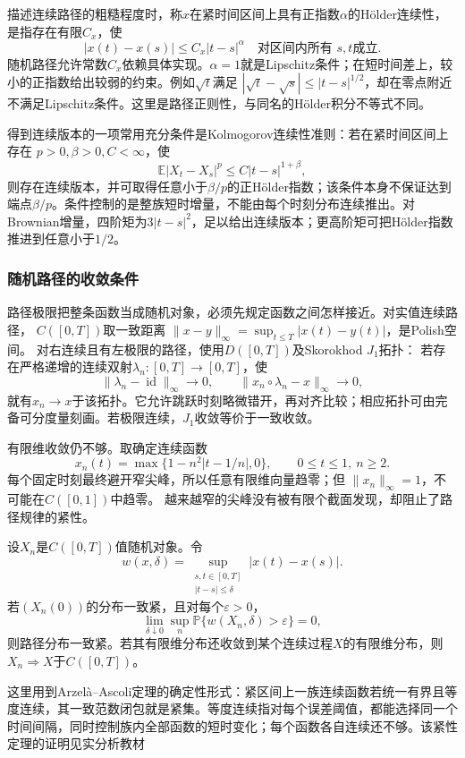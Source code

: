 描述连续路径的粗糙程度时，称\(x\)在紧时间区间上具有正指数\(\alpha\)的Hölder连续性，是指存在有限\(C_x\)，使
\[
 |x(t)-x(s)|\leq C_x|t-s|^\alpha
 \quad\text{对区间内所有 }s,t\text{成立}.
\]
随机路径允许常数\(C_x\)依赖具体实现。\(\alpha=1\)就是Lipschitz条件；在短时间差上，较小的正指数给出较弱的约束。例如\(\sqrt t\)满足
\(|\sqrt t-\sqrt s|\leq|t-s|^{1/2}\)，却在零点附近不满足Lipschitz条件。这里是路径正则性，与同名的Hölder积分不等式不同。

得到连续版本的一项常用充分条件是Kolmogorov连续性准则：若在紧时间区间上存在
\(p>0,\beta>0,C<\infty\)，使
\[
\mathbb E|X_t-X_s|^p\leq C|t-s|^{1+\beta},
\]
则存在连续版本，并可取得任意小于\(\beta/p\)的正Hölder指数；该条件本身不保证达到端点\(\beta/p\)。条件控制的是整族短时增量，不能由每个时刻分布连续推出。对Brownian增量，四阶矩为\(3|t-s|^2\)，足以给出连续版本；更高阶矩可把Hölder指数推进到任意小于\(1/2\)。

\subsubsection{随机路径的收敛条件}
\label{sec:rv-path-convergence}
路径极限把整条函数当成随机对象，必须先规定函数之间怎样接近。对实值连续路径，
\(C([0,T])\)取一致距离
\(\|x-y\|_\infty=\sup_{t\leq T}|x(t)-y(t)|\)，是Polish空间。
对右连续且有左极限的路径，使用\(D([0,T])\)及Skorokhod \(J_1\)拓扑：
若存在严格递增的连续双射\(\lambda_n:[0,T]\to[0,T]\)，使
\[
\|\lambda_n-\operatorname{id}\|_\infty\to0,\qquad
\|x_n\circ\lambda_n-x\|_\infty\to0,
\]
就有\(x_n\to x\)于该拓扑。它允许跳跃时刻略微错开，再对齐比较；相应拓扑可由完备可分度量刻画。若极限连续，\(J_1\)收敛等价于一致收敛。

有限维收敛仍不够。取确定连续函数
\[
x_n(t)=\max\{1-n^2|t-1/n|,0\},\qquad 0\leq t\leq1,\ n\geq2.
\]
每个固定时刻最终避开窄尖峰，所以任意有限维向量趋零；但
\(\|x_n\|_\infty=1\)，不可能在\(C([0,1])\)中趋零。
越来越窄的尖峰没有被有限个截面发现，却阻止了路径规律的紧性。

\begin{theorem}[连续路径的紧性与极限识别]
\label{thm:rv-continuous-path-tightness}
设\(X_n\)是\(C([0,T])\)值随机对象。令
\[
w(x,\delta)=\sup_{\substack{s,t\in[0,T]\\|t-s|\leq\delta}}|x(t)-x(s)|.
\]
若\((X_n(0))\)的分布一致紧，且对每个\(\varepsilon>0\)，
\[
\lim_{\delta\downarrow0}\sup_n
\mathbb P\{w(X_n,\delta)>\varepsilon\}=0,
\]
则路径分布一致紧。若其有限维分布还收敛到某个连续过程\(X\)的有限维分布，则
\(X_n\Rightarrow X\)于\(C([0,T])\)。
\end{theorem}
这里用到Arzelà--Ascoli定理的确定性形式：紧区间上一族连续函数若统一有界且等度连续，其一致范数闭包就是紧集。等度连续指对每个误差阈值，都能选择同一个时间间隔，同时控制族内全部函数的短时变化；每个函数各自连续还不够。该紧性定理的证明见实分析教材

